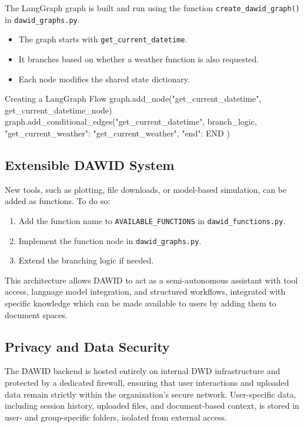 The LangGraph graph is built and run using the function \texttt{create\_dawid\_graph()} in \texttt{dawid\_graphs.py}.

\begin{itemize}
    \item The graph starts with \texttt{get\_current\_datetime}.
    \item It branches based on whether a weather function is also requested.
    \item Each node modifies the shared state dictionary.
\end{itemize}

\begin{codeonly}{Creating a LangGraph Flow}
graph.add_node("get_current_datetime", get_current_datetime_node)
graph.add_conditional_edges("get_current_datetime", branch_logic, {
    "get_current_weather": "get_current_weather",
    "end": END
})
\end{codeonly}

%
\subsection*{Extensible DAWID System}

New tools, such as plotting, file downloads, or model-based simulation, can be added as functions. To do so:
\begin{enumerate}
    \item Add the function name to \texttt{AVAILABLE\_FUNCTIONS} in \texttt{dawid\_functions.py}.
    \item Implement the function node in \texttt{dawid\_graphs.py}.
    \item Extend the branching logic if needed.
\end{enumerate}

This architecture allows DAWID to act as a semi-autonomous assistant with tool access, language model integration, and structured workflows, integrated with specific knowledge which can be made available to users by adding them to document spaces. 

%
\subsection*{Privacy and Data Security}
The DAWID backend is hosted entirely on internal DWD infrastructure and protected by a dedicated firewall, ensuring that user interactions and uploaded data remain strictly within the organization's secure network. User-specific data, including session history, uploaded files, and document-based context, is stored in user- and group-specific folders, isolated from external access.

